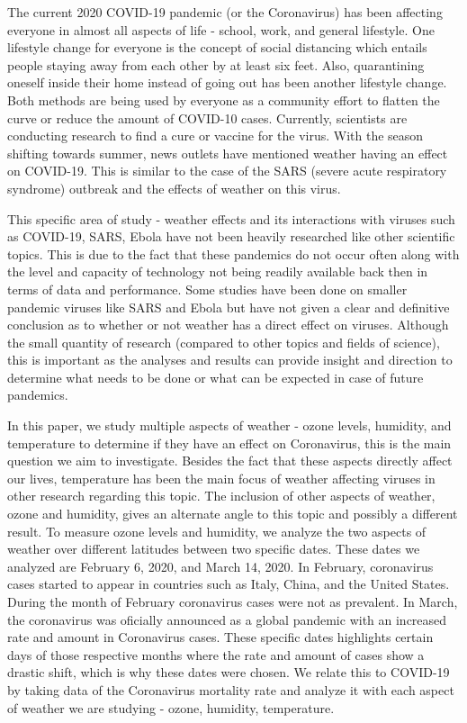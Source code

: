 \documentclass[10pt,journal,compsoc]{IEEEtran}
\begin{document}
The current 2020 COVID-19 pandemic  (or the Coronavirus) has been affecting everyone in almost all aspects of life - school, work, and general lifestyle. One lifestyle change for everyone is the concept of social distancing which entails people staying away from each other by at least six feet. Also, quarantining oneself inside their home instead of going out has been another lifestyle change. Both methods are being used by everyone as a community effort to flatten the curve or reduce the amount of COVID-10 cases. Currently, scientists are conducting research to find a cure or vaccine for the virus. With the season shifting towards summer, news outlets have mentioned weather having an effect on COVID-19. This is similar to the case of the SARS (severe acute respiratory syndrome) outbreak and the effects of weather on this virus. \cite{Tan-2005}

	This specific area of study - weather effects and its interactions with viruses such as COVID-19, SARS, Ebola have not been heavily researched like other scientific topics. This is due to the fact that these pandemics do not occur often along with the level and capacity of technology not being readily available back then in terms of data and performance. Some studies have been done on smaller pandemic viruses like SARS and Ebola but have not given a clear and definitive conclusion as to whether or not weather has a direct effect on viruses. Although the small quantity of research (compared to other topics and fields of science), this is important as the analyses and results can provide insight and direction to determine what needs to be done or what can be expected in case of future pandemics.

	In this paper, we study multiple aspects of weather - ozone levels, humidity, and temperature to determine if they have an effect on Coronavirus, this is the main question we aim to investigate. Besides the fact that these aspects directly affect our lives, temperature has been the main focus of weather affecting viruses in other research regarding this topic. The inclusion of other aspects of weather, ozone and humidity, gives an alternate angle to this topic and possibly a different result. To measure ozone levels and humidity, we analyze the two aspects of weather over different latitudes between two specific dates. These dates we analyzed are February 6, 2020, and March 14, 2020. In February, coronavirus cases started to appear in countries such as Italy, China, and the United States. During the month of February coronavirus cases were not as prevalent. In March, the coronavirus was oficially announced as a global pandemic with an increased rate and amount in Coronavirus cases. These specific dates highlights certain days of those respective months where the rate and amount of cases show a drastic shift, which is why these dates were chosen. We relate this to COVID-19 by taking data of the Coronavirus mortality rate and analyze it with each aspect of weather we are studying - ozone, humidity, temperature.
\end{document}
